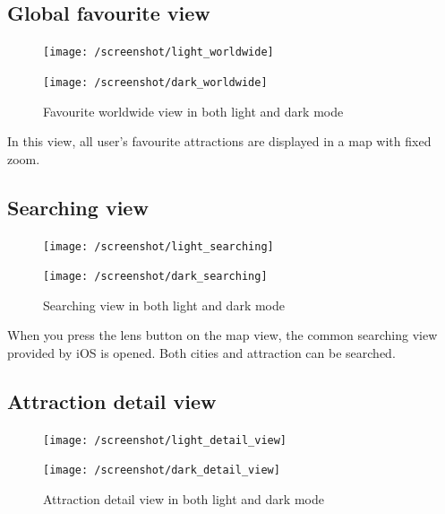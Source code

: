 \documentclass[a4paper, 11pt, parskip=half]{scrreprt}
\theoremstyle{definition}
\begin{document}
\subsection{Global favourite view}
\begin{figure}[H]
	\centering
	\begin{minipage}{.5\textwidth}
  	\centering
  	\texttt{[image: /screenshot/light\_worldwide]}
  	\label{fig:test1}
	\end{minipage}%
	\begin{minipage}{.5\textwidth}
  	\centering
  	\texttt{[image: /screenshot/dark\_worldwide]}
  	\label{fig:test2}
	\end{minipage}
	\caption{Favourite worldwide view in both light and dark mode}
\end{figure}
In this view, all user's favourite attractions are displayed in a map with fixed zoom. 

\subsection{Searching view}
\begin{figure}[H]
	\centering
	\begin{minipage}{.5\textwidth}
  	\centering
  	\texttt{[image: /screenshot/light\_searching]}
  	\label{fig:test1}
	\end{minipage}%
	\begin{minipage}{.5\textwidth}
  	\centering
  	\texttt{[image: /screenshot/dark\_searching]}
  	\label{fig:test2}
	\end{minipage}
	\caption{Searching view in both light and dark mode}
\end{figure}

When you press the lens button on the map view, the common searching view provided by iOS is opened. Both cities and attraction can be searched.

\subsection{Attraction detail view}
\begin{figure}[H]
	\centering
	\begin{minipage}{.5\textwidth}
  	\centering
  	\texttt{[image: /screenshot/light\_detail\_view]}
  	\label{fig:test1}
	\end{minipage}%
	\begin{minipage}{.5\textwidth}
  	\centering
  	\texttt{[image: /screenshot/dark\_detail\_view]}
  	\label{fig:test2}
	\end{minipage}
	\caption{Attraction detail view in both light and dark mode}
\end{figure}
\end{document}
